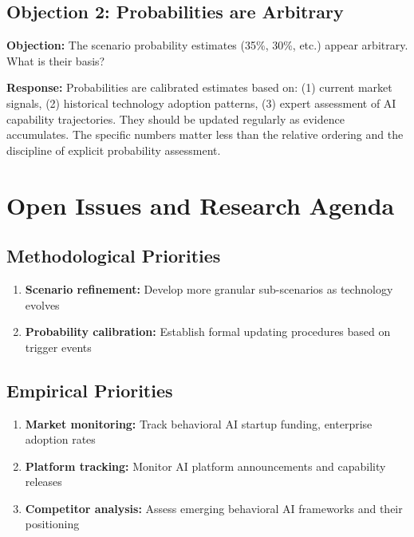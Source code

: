 \subsection{Objection 2: Probabilities are Arbitrary}

\textbf{Objection:} The scenario probability estimates (35\%, 30\%, etc.)
appear arbitrary. What is their basis?

\textbf{Response:} Probabilities are calibrated estimates based on:
(1) current market signals, (2) historical technology adoption patterns,
(3) expert assessment of AI capability trajectories. They should be
updated regularly as evidence accumulates. The specific numbers matter
less than the relative ordering and the discipline of explicit probability
assessment.


\section{Open Issues and Research Agenda}
\label{sec:vvv1-open}

\subsection{Methodological Priorities}

\begin{enumerate}
    \item \textbf{Scenario refinement:} Develop more granular sub-scenarios
        as technology evolves
    \item \textbf{Probability calibration:} Establish formal updating
        procedures based on trigger events
\end{enumerate}

\subsection{Empirical Priorities}

\begin{enumerate}
    \item \textbf{Market monitoring:} Track behavioral AI startup funding,
        enterprise adoption rates
    \item \textbf{Platform tracking:} Monitor AI platform announcements and
        capability releases
    \item \textbf{Competitor analysis:} Assess emerging behavioral AI
        frameworks and their positioning
\end{enumerate}


